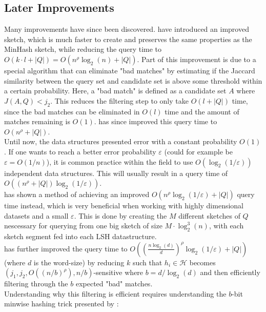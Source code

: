 \subsection{Later Improvements}
Many improvements have since been discovered.
\citet{dahlgaard2017fast} have introduced an improved sketch, which is much faster to create and preserves the same properties as the MinHash sketch, while reducing the query time to $O(k\cdot l + |Q|)=O(n^\rho \log_2(n) + |Q|)$. Part of this improvement is due to a special algorithm that can eliminate "bad matches" by estimating if the Jaccard similarity between the query set and candidate set is above some threshold within a certain probability. Here, a "bad match" is defined as a candidate set $A$ where $J(A, Q) < j_2$. 
This reduces the filtering step to only take $O(l + |Q|)$ time, since the bad matches can be eliminated in $O(l)$ time and the amount of matches remaining is $O(1)$. \citet{christiani2018fast} has since improved this query time to $O(n^\rho + |Q|)$. \\
Until now, the data structures presented error with a constant probability $O(1)$. If one wants to reach a better error probability $\varepsilon$ (could for example be $\varepsilon = O(1/n)$), it is common practice within the field to use $O(\log_2(1/\varepsilon))$ independent data structures. This will usually result in a query time of $O((n^\rho + |Q|)\log_2(1/\varepsilon))$. \\
\citet{fast-similarity-search} has shown a method of achieving an improved $O(n^\rho \log_2(1/\varepsilon)+|Q|)$ query time instead, which is very beneficial when working with highly dimensional datasets and a small $\varepsilon$. This is done by creating the $M$ different sketches of $Q$ nescessary for querying from one big sketch of size $M\cdot \log^3_2(n)$, with each sketch segment fed into each LSH datastructure.\\
\citet{fast-similarity-search} has further improved the query time to $O((\frac{n\log_2(d)}{d})^{\rho}\log_2(1/\varepsilon)+|Q|)$ (where $d$ is the word-size) by reducing $k$ such that $h_i\in \mathcal{H}$ becomes $(j_1, j_2, O((n/b)^\rho), n/b)$-sensitive where $b=d/\log_2(d)$ and then efficiently filtering through the $b$ expected "bad" matches. \\
Understanding why this filtering is efficient requires understanding the $b$-bit minwise hashing trick presented by \citet{li2011hashing}:
